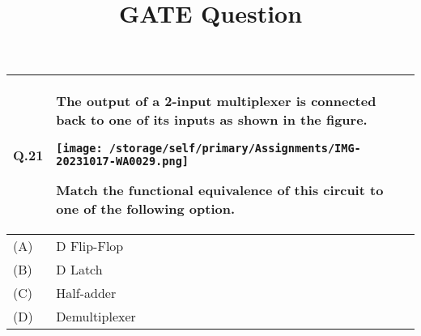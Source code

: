 \documentclass{article}
\begin{document}
\title{GATE Question}
\begin{center}
\begin{tabular}{|m{1cm}|m{13cm}|}
	\hline
	Q.21 & The output of a 2-input multiplexer is connected back to one of its inputs as shown in the figure.
	\begin{center}
		\newline \texttt{[image: /storage/self/primary/Assignments/IMG-20231017-WA0029.png]}
	\end{center}
		\newline Match the functional equivalence of this circuit to one of the following option. \\
	\hline
	(A) & D Flip-Flop \\
	\hline
	(B) & D Latch \\
	\hline
	(C) & Half-adder\\
	\hline
	(D) & Demultiplexer \\
	\hline
\end{tabular}
\end{center}
\end{document}
